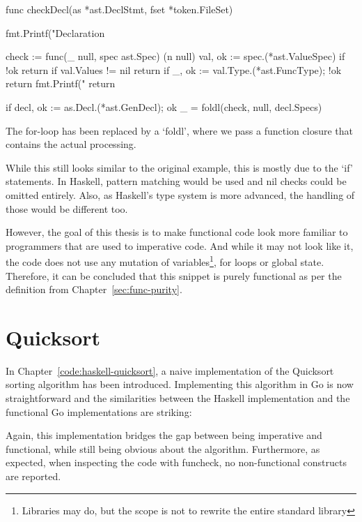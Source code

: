 \begin{code}
	\begin{gocode}
func checkDecl(as *ast.DeclStmt, fset *token.FileSet) {
	fmt.Printf("Declaration %

	check := func(_ null, spec ast.Spec) (n null) {
		val, ok := spec.(*ast.ValueSpec)
		if !ok {
			return
		}
		if val.Values != nil {
			return
		}
		if _, ok := val.Type.(*ast.FuncType); !ok {
			return
		}
		fmt.Printf("\tIdent %
		return
	}

	if decl, ok := as.Decl.(*ast.GenDecl); ok {
		_ = foldl(check, null{}, decl.Specs)
	}
}
\end{gocode}
\end{code}
The for-loop has been replaced by a `foldl', where we pass a function closure
that contains the actual processing.

While this still looks similar to the original example, this is mostly due to
the `if' statements. In Haskell, pattern matching would be used and nil checks
could be omitted entirely. Also, as Haskell's type system is more advanced, the
handling of those would be different too.

However, the goal of this thesis is to make functional code look more familiar
to programmers that are used to imperative code.
And while it may not look like it, the code does not use any mutation of
variables\footnote{Libraries may do, but the scope is not to rewrite the entire
standard library}, for loops or global state. Therefore, it can be concluded that this
snippet is purely functional as per the definition from Chapter~\ref{sec:func-purity}.

\section{Quicksort}

In Chapter~\ref{code:haskell-quicksort}, a naive implementation of the Quicksort sorting
algorithm has been introduced.
Implementing this algorithm in Go is now straightforward and the similarities between
the Haskell implementation and the functional Go implementations are striking:

\begin{code}
\end{code}

Again, this implementation bridges the gap between being imperative and functional,
while still being obvious about the algorithm.
Furthermore, as expected, when inspecting the code with funcheck, no non-functional
constructs are reported.

